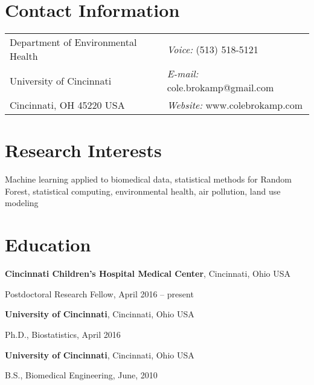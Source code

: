 \documentclass[margin,line]{res}
\newenvironment{list1}{
  \begin{list}{\ding{113}}{%
      \setlength{\itemsep}{0in}
      \setlength{\parsep}{0in} \setlength{\parskip}{0in}
      \setlength{\topsep}{0in} \setlength{\partopsep}{0in} 
      \setlength{\leftmargin}{0.17in}}}{\end{list}}
\begin{document}

\begin{resume}
\section{\sc Contact Information}
\vspace{.05in}
\begin{tabular}{@{}p{3in}p{4in}}      
Department of Environmental Health  & {\it Voice:}  (513) 518-5121 \\         
University of Cincinnati & {\it E-mail:}  cole.brokamp@gmail.com\\       
Cincinnati, OH 45220 USA  & {\it Website:} www.colebrokamp.com \\     
\end{tabular}


\section{\sc Research Interests}
Machine learning applied to biomedical data, statistical methods for Random Forest,
statistical computing, environmental health, air pollution, land use modeling

\section{\sc Education}

{\bf Cincinnati Children's Hospital Medical Center}, Cincinnati, Ohio USA \\
\vspace*{-.1in}
\begin{list1}
    \item[]Postdoctoral Research Fellow, April 2016 -- present
\end{list1}

{\bf University of Cincinnati}, Cincinnati, Ohio USA \\
\vspace*{-.1in}
\begin{list1}
\item[]Ph.D., Biostatistics, April 2016
\end{list1}

{\bf University of Cincinnati}, Cincinnati, Ohio USA\\
\vspace*{-.1in}
\begin{list1}
\item[]B.S., Biomedical Engineering,  June, 2010
\end{list1}



\end{resume}
\end{document}
